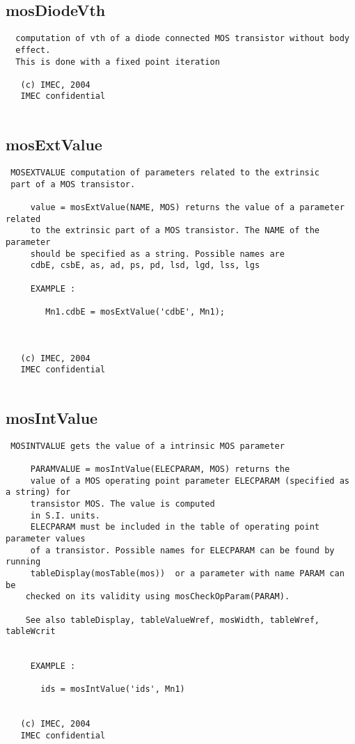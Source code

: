 \newpage
\subsection{mosDiodeVth}
\label{sec:mosDiodeVth}
\begin{verbatim}
  computation of vth of a diode connected MOS transistor without body
  effect.
  This is done with a fixed point iteration
 
   (c) IMEC, 2004
   IMEC confidential 
 

\end{verbatim}

\newpage
\subsection{mosExtValue}
\label{sec:mosExtValue}
\begin{verbatim}
 MOSEXTVALUE computation of parameters related to the extrinsic 
 part of a MOS transistor.
 
     value = mosExtValue(NAME, MOS) returns the value of a parameter related
     to the extrinsic part of a MOS transistor. The NAME of the parameter
     should be specified as a string. Possible names are
     cdbE, csbE, as, ad, ps, pd, lsd, lgd, lss, lgs
 
     EXAMPLE :
 
        Mn1.cdbE = mosExtValue('cdbE', Mn1);
 
 
 
   (c) IMEC, 2004
   IMEC confidential 
 

\end{verbatim}

\newpage
\subsection{mosIntValue}
\label{sec:mosIntValue}
\begin{verbatim}
 MOSINTVALUE gets the value of a intrinsic MOS parameter 
 
     PARAMVALUE = mosIntValue(ELECPARAM, MOS) returns the
     value of a MOS operating point parameter ELECPARAM (specified as a string) for
     transistor MOS. The value is computed
     in S.I. units.   
     ELECPARAM must be included in the table of operating point parameter values
     of a transistor. Possible names for ELECPARAM can be found by running
     tableDisplay(mosTable(mos))  or a parameter with name PARAM can be
    checked on its validity using mosCheckOpParam(PARAM).                                           
 
    See also tableDisplay, tableValueWref, mosWidth, tableWref, tableWcrit
    
 
     EXAMPLE :
 
       ids = mosIntValue('ids', Mn1)
 
 
   (c) IMEC, 2004
   IMEC confidential 
 

\end{verbatim}

